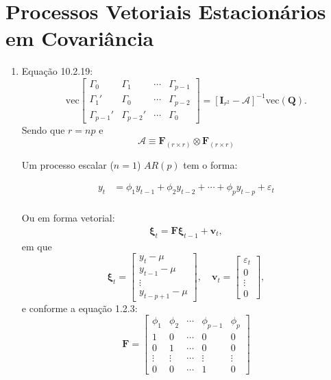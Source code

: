 \setcounter{chapter}{9}
\chapter{Processos Vetoriais Estacionários em Covariância}

\begin{enumerate}
	\item[\fbox{10.1}]
	
	Equação 10.2.19: $$\text{vec}\begin{bmatrix}
	\Gamma_0&\Gamma_1&\cdots&\Gamma_{p-1}\\
	\Gamma_1'&\Gamma_0&\cdots&\Gamma_{p-2}\\
	\Gamma_{p-1}'&\Gamma_{p-2}'&\cdots&\Gamma_0
	\end{bmatrix}=[\mathbf{I}_{r^2}-\mathbf{\mathscr{A}}]^{-1}\text{vec}(\mathbf{Q}).$$
	Sendo que $r=np$ e $$\mathbf{\mathscr{A}}\equiv \mathbf{F}_{(r\times r)}\otimes\mathbf{F}_{(r\times r)}$$
	
	
	Um processo escalar ($n=1$) $AR(p)$ tem o forma:
	
	\begin{align*}
		y_t &= \phi_1y_{t-1}+\phi_2y_{t-2}+\cdots+\phi_py_{t-p}+\varepsilon_t\\
	\end{align*}

Ou em forma vetorial:
	\begin{align*}
		\boldsymbol{\xi}_t = \mathbf{F}\boldsymbol{\xi}_{t-1}+\mathbf{v}_t,
	\end{align*}
em que $$\boldsymbol{\xi}_t=\begin{bmatrix}
y_t-\mu\\
y_{t-1}-\mu\\
\vdots\\
y_{t-p+1}-\mu
\end{bmatrix} ,\quad \mathbf{v}_t=\begin{bmatrix}
\varepsilon_t\\
0\\
\vdots\\
0
\end{bmatrix},$$
e conforme a equação 1.2.3: $$\mathbf{F}=\begin{bmatrix}
\phi_1 &\phi_2&\cdots&\phi_{p-1}&\phi_p\\
1&0&\cdots&0&0\\
0&1&\cdots&0&0\\
\vdots&\vdots&\cdots&\vdots&\vdots\\
0&0&\cdots&1&0
\end{bmatrix}$$



\end{enumerate}
